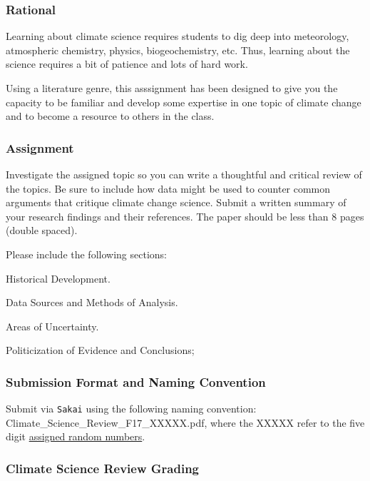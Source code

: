 
\subsubsection{Rational}

Learning about climate science requires students to dig deep into meteorology, atmospheric chemistry, physics, biogeochemistry, etc. Thus, learning about the science requires a bit of patience and lots of hard work. 

Using a literature genre, this asssignment has been designed to give you the capacity to be familiar and develop some expertise in one topic of climate change and to become a resource to others in the class.

\subsubsection{Assignment}

Investigate the assigned topic so you can write a thoughtful and critical review of the topics. Be sure to include how data might be used to counter common arguments that critique climate change science. Submit a written summary of your research findings and their references. The paper should be less than 8 pages (double spaced). 

Please include the following sections:

\begin{itemize*}
  \item Historical Development.
  \item Data Sources and Methods of Analysis.
  \item Areas of Uncertainty.
  \item Politicization of Evidence and Conclusions;
\end{itemize*}
 
\subsubsection{Submission Format and Naming Convention}

Submit via \texttt{Sakai} using the following naming convention: Climate\_Science\_Review\_F17\_XXXXX.pdf, where the XXXXX refer to the five digit \href{https://github.com/marclos/Climate_Change_Narratives/raw/master/Admin/RandomNumbers.pdf}{assigned random numbers}.

\subsubsection{Climate Science Review Grading}

